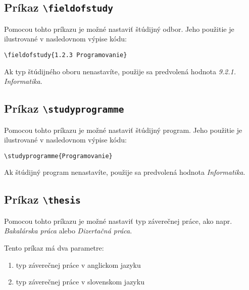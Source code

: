 \subsection{Príkaz {\tt \textbackslash{}fieldofstudy}}

Pomocou tohto príkazu je možné nastaviť štúdijný odbor. Jeho použitie je ilustrované v nasledovnom výpise kódu:

\begin{listing}[ht!]
\begin{verbatim}
\fieldofstudy{1.2.3 Programovanie}
\end{verbatim}
\caption{Príklad použitia príkazu {\tt \textbackslash{}fieldofstudy} pre nastavenie štúdijného oboru}
\end{listing}

Ak typ štúdijného oboru nenastavíte, použije sa predvolená hodnota {\it 9.2.1. Informatika}.


\subsection{Príkaz {\tt \textbackslash{}studyprogramme}}

Pomocou tohto príkazu je možné nastaviť štúdijný program. Jeho použitie je ilustrované v nasledovnom výpise kódu:

\begin{listing}[ht!]
\begin{verbatim}
\studyprogramme{Programovanie}
\end{verbatim}
\caption{Príklad použitia príkazu {\tt \textbackslash{}studyprogramme} pre nastavenie štúdijného programu}
\end{listing}

Ak štúdijný program nenastavíte, použije sa predvolená hodnota {\it Informatika}.


\subsection{Príkaz {\tt \textbackslash{}thesis}}

Pomocou tohto príkazu je možné nastaviť typ záverečnej práce, ako napr. {\it Bakalárska práca} alebo {\it Dizertačná práca}. 

Tento príkaz má dva parametre:
\begin{enumerate}
    \item typ záverečnej práce v anglickom jazyku
    \item typ záverečnej práce v slovenskom jazyku
\end{enumerate}

